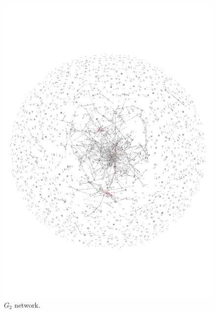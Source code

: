 \documentclass{article}
\theoremstyle{definition}
\begin{document}
\begin{figure}[!hbtp]
    \begin{minipage}{.45\textwidth}
        \centering
        \includegraphics[width=.9\textwidth]{./assets/auction.pdf}
        \caption{\(G_2\) network.}\label{fig:g_two}
    \end{minipage}
    \begin{minipage}{.45\textwidth}
        \centering

\end{minipage}
\end{figure}
\end{document}
